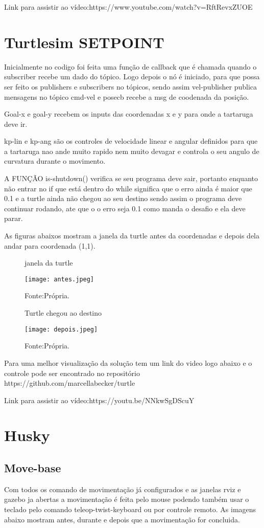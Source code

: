 Link para assistir ao vídeo:https://www.youtube.com/watch?v=RftRevxZUOE

\section{Turtlesim SETPOINT}
Inicialmente no codigo foi feita uma função de callback que é chamada quando o subscriber recebe um dado do tópico. 
Logo depois o nó é iniciado, para que possa ser feito os publishers e subscribers no tópicos, sendo assim 
vel-publisher publica mensagens no tópico cmd-vel e posecb recebe a msg de coodenada da posição.

Goal-x e goal-y recebem os inputs das coordenadas x e y para onde a tartaruga deve ir. 

kp-lin e kp-ang são os controles de velocidade linear e angular definidos para que a tartaruga nao ande muito rapido nem
muito devagar e controla o seu angulo de curvatura durante o movimento.

A FUNÇÃO is-shutdown() verifica se seu programa deve sair, portanto enquanto não entrar no if que está dentro do while significa que o erro ainda é 
maior que 0.1 e a turtle ainda não chegou ao seu destino sendo assim o programa deve continuar rodando, ate que o o erro seja 0.1 como manda o desafio
e ela deve parar.

As figuras abaixos mostram a janela da turtle antes da coordenadas e depois dela andar para coordenada (1,1).

\begin{figure} [h!]	
    \centering
    \caption{janela da turtle}
    \texttt{[image: antes.jpeg]}
    \caption*{Fonte:Própria.}
    \label{fig:inicio}
\end{figure}

\begin{figure} [h!]	
    \centering
    \caption{Turtle chegou ao destino}
    \texttt{[image: depois.jpeg]}
    \caption*{Fonte:Própria.}
    \label{fig:fim}
\end{figure}
Para uma melhor visualização da solução tem um link do video 
logo abaixo e o controle pode ser encontrado no repositório https://github.com/marcellabecker/turtle  

Link para assistir ao vídeo:https://youtu.be/NNkwSgDScuY
\section{Husky}
\subsection{Move-base}
Com todos os comando de movimentação já configurados e as janelas rviz e gazebo ja abertas a movimentação é feita pelo mouse podendo também usar o teclado pelo comando teleop-twist-keyboard ou por controle remoto.
As imagens abaixo mostram antes, durante e depois que a movimentação for concluida. 

